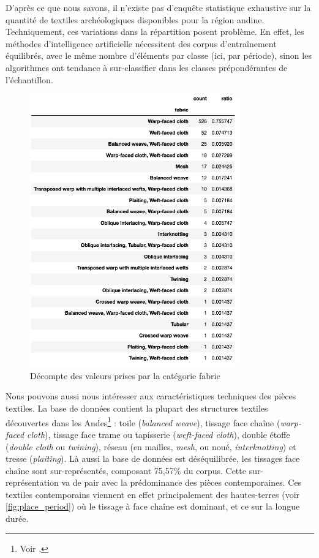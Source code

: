 D'après ce que nous savons, il n'existe pas d'enquête statistique exhaustive sur la quantité de textiles archéologiques disponibles pour la région andine. Techniquement, ces variations dans la répartition posent problème. En effet, les méthodes d'intelligence artificielle nécessitent des corpus d'entraînement équilibrés, avec le même nombre d'éléments par classe (ici, par période), sinon les algorithmes ont tendance à sur-classifier dans les classes prépondérantes de l'échantillon.

 \begin{figure}[!h]
        \begin{center}
        		\includegraphics[width=9cm]{../images/count_fabric.png}
	\end{center}
    \caption{Décompte des valeurs prises par la catégorie \og fabric\fg}     
    \label{fig:fabric}
\end{figure}

\clearpage

Nous pouvons aussi nous intéresser aux caractéristiques techniques des pièces textiles. La base de données contient la plupart des structures textiles découvertes dans les Andes\footnote{Voir \cite{harcourtTextilesAnciensPerou2008}.} : toile (\textit{balanced weave}), tissage face chaîne (\textit{warp-faced cloth}), tissage face trame ou tapisserie (\textit{weft-faced cloth}), double étoffe (\textit{double cloth} ou \textit{twining}), réseau (en mailles, \textit{mesh}, ou noué, \textit{interknotting}) et tresse (\textit{plaiting}). 
Là aussi la base de données est déséquilibrée, les tissages face chaîne sont sur-représentés, composant 75,57\% du corpus. Cette sur-représentation va de pair avec la prédominance des pièces contemporaines. Ces textiles contemporains viennent en effet principalement des hautes-terres (voir \ref{fig:place_period}) où le tissage à face chaîne est dominant, et ce sur la longue durée. \\

